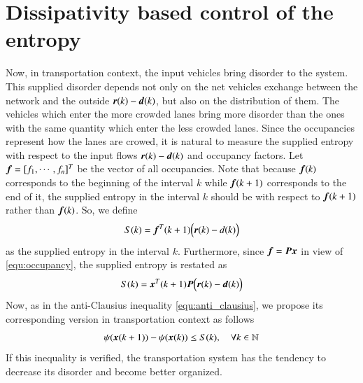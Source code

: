 \documentclass[preprint,authoryear,12pt]{elsarticle}
\renewcommand{\vec}[1]{\mbox{\boldmath$#1$}}
\newcommand{\mat}[1]{\mbox{\boldmath$#1$}}
\begin{document}

\section{Dissipativity based control of the entropy}
\label{sec:dissipativity}

Now, in transportation context, the input vehicles bring disorder to
the system. This supplied disorder depends not only on  the  net vehicles exchange between the network and the outside  $\vec{r}(k)-\vec{d}(k)$, but also on the distribution of them. The vehicles
which enter the more crowded lanes bring more disorder than the ones
with the same quantity which enter the less crowded lanes. Since the
occupancies represent how the lanes are crowed, it is natural to
measure the supplied entropy with respect to the input flows $\vec{r}(k)-\vec{d}(k)$ and 
occupancy factors. Let $\vec{f}=[f_1,\cdots,f_n]^T$ be the vector of
all occupancies. Note that because $\vec{f}(k)$ corresponds to the
beginning of the interval $k$ while $\vec{f}(k+1)$ corresponds to the
end of it, the supplied entropy in the interval $k$ should be with respect 
to $\vec{f}(k+1)$ rather than $\vec{f}(k)$. So, we define
$$S(k)=\vec{f}^T(k+1)\Bigl(\vec{r}(k)-d(k)\Bigr)$$
as the supplied entropy in the interval $k$. Furthermore, since
$\vec{f}=\mat{P}\vec{x}$ in view of \eqref{equ:occupancy}, the
supplied entropy is restated as
\begin{equation}\label{equ:supply}
    S(k)=\vec{x}^T(k+1) \mat{P} \Bigl(\vec{r}(k)-\vec{d}(k)\Bigr)
\end{equation}
Now, as in the anti-Clausius inequality \eqref{equ:anti_clausius}, we
propose its corresponding version in transportation context as
follows
\begin{equation}\label{equ:dissipative}
\psi(\vec{x}(k+1))-\psi(\vec{x}(k)) \leq S(k),\quad \forall
k\in\mathbb{N}
\end{equation}
If this inequality is verified, the transportation system has the
tendency to decrease its disorder and become better organized.
\end{document}
